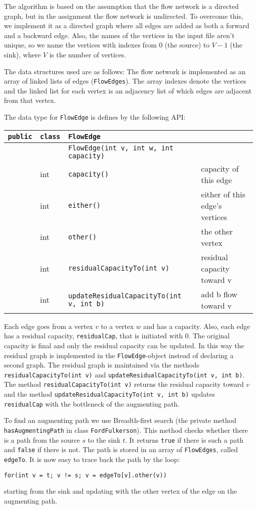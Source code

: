 \documentclass{tufte-handout}
\begin{document}
The algorithm is based on the assumption that the flow network is a directed graph, but in the assignment the flow network is undirected. To overcome this, we implement it as a directed graph where all edges are added as both a forward and a backward edge. Also, the names of the vertices in the input file aren't unique, so we name the vertices with indexes from 0 (the source) to $V-1$ (the sink), where $V$ is the number of vertices.

The data structures used are as follows: The flow network is implemented as an array of linked lists of edges (\verb#FlowEdges#). The array indexes denote the vertices and the linked list for each vertex is an adjacency list of which edges are adjacent from that vertex. 

The data type for \verb#FlowEdge# is defines by the following API:

  \bigskip
 \begin{tabular}{llll}
	\verb#public# 	& \verb#class# 	& \verb#FlowEdge# 						& \\\midrule
					&				& \verb#FlowEdge(int v, int w, int capacity)#	& \\
					& int			& \verb#capacity()#							& capacity of this edge \\
					& int			& \verb#either()#									& either of this edge's vertices \\
					& int 			& \verb#other()#									& the other vertex \\
					& int 			& \verb#residualCapacityTo(int v)#			& residual capacity toward v \\
					& int 			& \verb#updateResidualCapacityTo(int v, int b)# & add b flow toward v
\end{tabular}
\bigskip

Each edge goes from a vertex $v$ to a vertex $w$ and has a capacity. Also, each edge has a residual capacity, \verb#residualCap#, that is initiated with 0. The original capacity is final and only the residual capacity can be updated. In this way the residual graph is implemented in the \verb#FlowEdge#-object instead of declaring a second graph. The residual graph is maintained via the methods \verb#residualCapacityTo(int v)# and \verb#updateResidualCapacityTo(int v, int b)#. The method \verb#residualCapacityTo(int v)# returns the residual capacity toward $v$ and the method \verb#updateResidualCapacityTo(int v, int b)# updates \verb#residualCap# with the bottleneck of the augmenting path.
  
To find an augmenting path we use Breadth-first search (the private method \verb#hasAugmentingPath# in class \verb#FordFulkerson#). This method checks whether there is a path from the source $s$ to the sink $t$. It returns \verb#true# if there is such a path and \verb#false# if there is not. The path is stored in an array of \verb#FlowEdges#, called \verb#edgeTo#. It is now easy to trace back the path by the loop:
\begin{verbatim}
for(int v = t; v != s; v = edgeTo[v].other(v)) 
\end{verbatim}
starting from the sink and updating with the other vertex of the edge on the augmenting path. 
\end{document}
